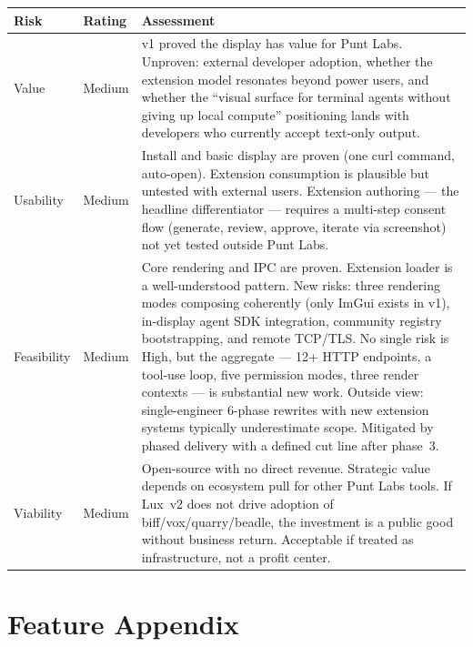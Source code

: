 \documentclass[11pt,letterpaper]{article}
\begin{document}
\renewcommand{\arraystretch}{1.6}
\begin{tabularx}{\textwidth}{@{} l l X @{}}
\toprule
\textbf{\color{SectionBlue}Risk} & \textbf{\color{SectionBlue}Rating} & \textbf{\color{SectionBlue}Assessment} \\
\midrule
Value      & \textcolor{RiskAmber}{Medium} &
  v1 proved the display has value for Punt Labs.  Unproven: external
  developer adoption, whether the extension model resonates beyond power
  users, and whether the ``visual surface for terminal agents without
  giving up local compute'' positioning lands with developers who currently
  accept text-only output. \\
Usability  & \textcolor{RiskAmber}{Medium} &
  Install and basic display are proven (one curl command, auto-open).
  Extension consumption is plausible but untested with external users.
  Extension authoring --- the headline differentiator --- requires a
  multi-step consent flow (generate, review, approve, iterate via
  screenshot) not yet tested outside Punt Labs. \\
Feasibility & \textcolor{RiskAmber}{Medium} &
  Core rendering and IPC are proven.  Extension loader is a
  well-understood pattern.  New risks: three rendering modes composing
  coherently (only ImGui exists in v1), in-display agent SDK integration,
  community registry bootstrapping, and remote TCP/TLS.  No single risk
  is High, but the aggregate --- 12+ HTTP endpoints, a tool-use loop,
  five permission modes, three render contexts --- is substantial new
  work.  Outside view: single-engineer 6-phase rewrites with new
  extension systems typically underestimate scope.  Mitigated by
  phased delivery with a defined cut line after phase~3. \\
Viability  & \textcolor{RiskAmber}{Medium} &
  Open-source with no direct revenue.  Strategic value depends on
  ecosystem pull for other Punt Labs tools.  If Lux~v2 does not drive
  adoption of biff/vox/quarry/beadle, the investment is a public good
  without business return.  Acceptable if treated as infrastructure,
  not a profit center. \\
\bottomrule
\end{tabularx}
\renewcommand{\arraystretch}{1.0}


\newpage
\section*{Feature Appendix}
\end{document}
